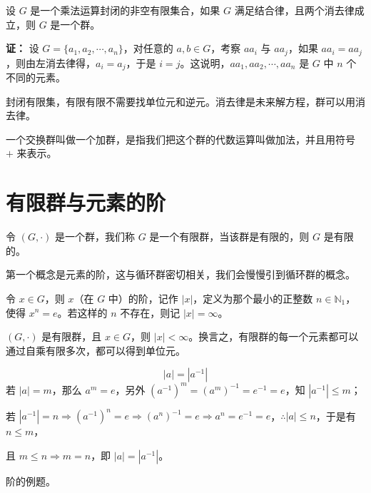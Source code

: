 \begin{theorem}[消去律与有限群判定]
设 $G$ 是一个乘法运算封闭的非空有限集合，如果 $G$ 满足结合律，且两个消去律成立，则 $G$ 是一个群。

\textbf{证：} 设 $G=\{a_1,a_2,\cdots,a_n\}$，对任意的 $a,b\in G$，考察 $aa_i$ 与 $aa_j$，如果 $aa_i=aa_j$，则由左消去律得，$a_i=a_j$，于是 $i=j$。这说明，$aa_1,aa_2,\cdots,aa_n$ 是 $G$ 中 $n$ 个不同的元素。

封闭有限集，有限有限不需要找单位元和逆元。消去律是未来解方程，群可以用消去律。
\end{theorem}

\begin{definition}[加群]
一个交换群叫做一个加群，是指我们把这个群的代数运算叫做加法，并且用符号 $+$ 来表示。
\end{definition}

\section{有限群与元素的阶}

\begin{definition}[有限群（定义 1.20）]
令 $(G,\cdot)$ 是一个群，我们称 $G$ 是一个有限群，当该群是有限的，则 $G$ 是有限的。

第一个概念是元素的阶，这与循环群密切相关，我们会慢慢引到循环群的概念。

令 $x\in G$，则 $x$（在 $G$ 中）的阶，记作 $|x|$，定义为那个最小的正整数 $n\in\mathbb{N}_1$，使得 $x^n=e$。若这样的 $n$ 不存在，则记 $|x|=\infty$。
\end{definition}

\begin{proposition}[命题 1.21]
$(G,\cdot)$ 是有限群，且 $x\in G$，则 $|x|<\infty$。换言之，有限群的每一个元素都可以通过自乘有限多次，都可以得到单位元。
\end{proposition}

\begin{proposition}[$a$ 和 $a^{-1}$ 阶数一样]
\[
|a|=|a^{-1}|
\]
若 $|a|=m$，那么 $a^m=e$，另外 $(a^{-1})^m=(a^m)^{-1}=e^{-1}=e$，知 $|a^{-1}|\le m$；

若 $|a^{-1}|=n\Rightarrow(a^{-1})^n=e\Rightarrow(a^n)^{-1}=e\Rightarrow a^n=e^{-1}=e$，$\therefore|a|\le n$，于是有 $n\le m$，

且 $m\le n\Rightarrow m=n$，即 $|a|=|a^{-1}|$。
\end{proposition}

\begin{example}[阶的例题]
阶的例题。
\end{example}

